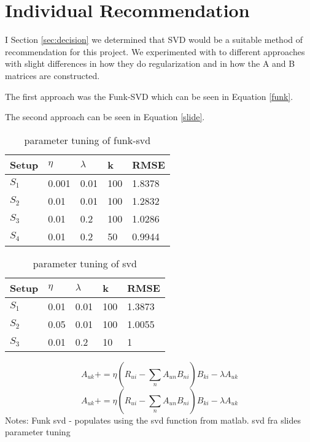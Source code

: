 \section{Individual Recommendation}\label{sec:individual_recommendation}
I Section \ref{sec:decision} we determined that SVD would be a suitable method of recommendation for this project. 
We experimented with to different approaches with slight differences in how they do regularization and in how the A and B matrices are constructed.

The first approach was the Funk-SVD which can be seen in Equation \ref{funk}.  

The second approach can be seen in Equation \ref{slide}.


\begin{table}[]
\centering
\caption{parameter tuning of funk-svd}
\label{my-label}
\begin{tabular}{|l|llll|}
\hline
Setup	& $\eta$ & $\lambda$ & k   & RMSE   \\ \hline
$S_1$	& 0.001  & 0.01      & 100 & 1.8378 \\ \hline
$S_2$	& 0.01   & 0.01      & 100 & 1.2832 \\ \hline
$S_3$	& 0.01   & 0.2       & 100 & 1.0286 \\ \hline
$S_4$	& 0.01   & 0.2		 & 50  & 0.9944 \\ \hline
\end{tabular}
\end{table}

\begin{table}[]
\centering
\caption{parameter tuning of svd}
\label{my-label}
\begin{tabular}{|l|llll|}
\hline
Setup	& $\eta$ & $\lambda$ & k   & RMSE \\ \hline
$S_1$	& 0.01   & 0.01   & 100 & 1.3873  \\ \hline
$S_2$	& 0.05   & 0.01   & 100  & 1.0055 \\ \hline
$S_3$	& 0.01   & 0.2    & 10 & 1		  \\ \hline
\end{tabular}
\end{table}



\begin{equation}\label{funk}
A_{uk} += \eta (R_{ui} - \sum_n A_{un}B_{ni})B_{ki} - \lambda A_{uk}
\end{equation}
\begin{equation}\label{slide}
A_{uk} += \eta (R_{ui} - \sum_n A_{un}B_{ni})B_{ki} - \lambda A_{uk}
\end{equation}
Notes: 
Funk svd - populates using the svd function from matlab.
svd fra slides
parameter tuning


